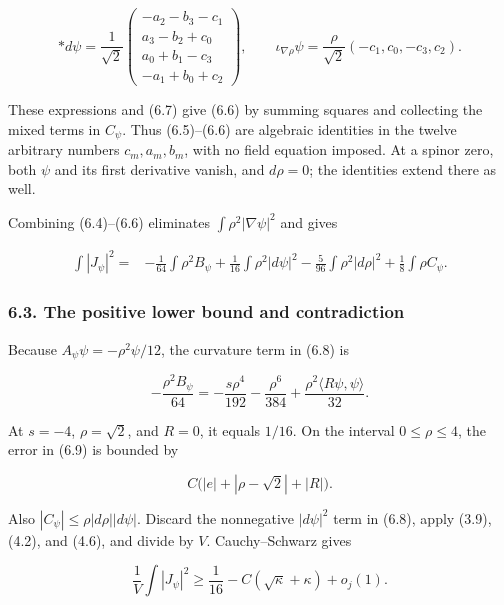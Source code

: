 \documentclass[
  10pt,
]{article}
\begin{document}
\[
 *d\psi=\frac1{\sqrt2}
 \begin{pmatrix}
  -a_2-b_3-c_1\\
   a_3-b_2+c_0\\
   a_0+b_1-c_3\\
  -a_1+b_0+c_2
 \end{pmatrix},
 \qquad
 \iota_{\nabla\rho}\psi
       =\frac{\rho}{\sqrt2}(-c_1,c_0,-c_3,c_2).
\]

These expressions and (6.7) give (6.6) by summing squares and collecting
the mixed terms in \(C_\psi\). Thus (6.5)--(6.6) are algebraic
identities in the twelve arbitrary numbers \(c_m,a_m,b_m\), with no
field equation imposed. At a spinor zero, both \(\psi\) and its first
derivative vanish, and \(d\rho=0\); the identities extend there as well.

Combining (6.4)--(6.6) eliminates \(\int\rho^2|\nabla\psi|^2\) and gives

\[
 \begin{aligned}
 \int|J_\psi|^2={}&-\frac1{64}\int\rho^2 B_\psi
       +\frac1{16}\int\rho^2|d\psi|^2
       -\frac5{96}\int\rho^2|d\rho|^2
       +\frac18\int\rho C_\psi.
 \end{aligned}                                              \tag{6.8}
\]

\hypertarget{the-positive-lower-bound-and-contradiction}{%
\subsubsection{6.3. The positive lower bound and
contradiction}\label{the-positive-lower-bound-and-contradiction}}

Because \(A_\psi\psi=-\rho^2\psi/12\), the curvature term in (6.8) is

\[
 -\frac{\rho^2B_\psi}{64}
        =-\frac{s\rho^4}{192}-\frac{\rho^6}{384}
                                +\frac{\rho^2\langle R\psi,\psi\rangle}{32}.
 \tag{6.9}
\]

At \(s=-4\), \(\rho=\sqrt2\), and \(R=0\), it equals \(1/16\). On the
interval \(0\le\rho\le4\), the error in (6.9) is bounded by

\[
                  C\bigl(|e|+|\rho-\sqrt2|+|R|\bigr).
\]

Also \(|C_\psi|\le\rho|d\rho||d\psi|\). Discard the nonnegative
\(|d\psi|^2\) term in (6.8), apply (3.9), (4.2), and (4.6), and divide
by \(V\). Cauchy--Schwarz gives

\[
 \frac1V\int|J_\psi|^2
                   \ge\frac1{16}-C(\sqrt\kappa+\kappa)+o_j(1).
 \tag{6.10}
\]
\end{document}
